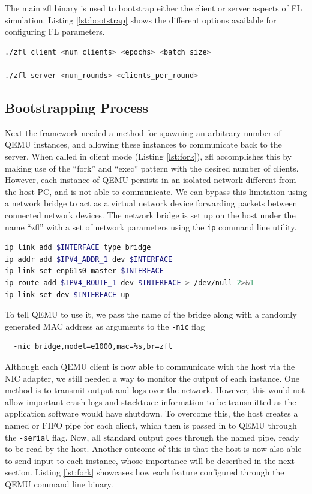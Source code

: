 \documentclass[12pt]{article}
\begin{document}
The main zfl binary is used to bootstrap either the client or server aspects of FL simulation.
Listing \ref{lst:bootstrap} shows the different options available for configuring FL parameters.
\begin{lstlisting}[language=bash,caption={The main zfl binary},label={lst:bootstrap}]
./zfl client <num_clients> <epochs> <batch_size>

./zfl server <num_rounds> <clients_per_round>
\end{lstlisting}

\subsection{Bootstrapping Process}
Next the framework needed a method for spawning an arbitrary number of QEMU instances, and allowing
these instances to communicate back to the server. When called in client mode (Listing
\ref{lst:fork}), zfl accomplishes this
by making use of the ``fork'' and ``exec'' pattern with the desired number of clients. \\

However, each instance of QEMU persists in an isolated network different from the host PC,
and is not able to communicate. We can bypass this limitation using a network bridge to act as a
virtual network device forwarding packets between connected network devices.
The network bridge is set up on the host under the name ``zfl'' with a set of network parameters using
the \verb|ip| command line utility.
\begin{lstlisting}[language=bash,caption=Network bridge setup]
ip link add $INTERFACE type bridge
ip addr add $IPV4_ADDR_1 dev $INTERFACE
ip link set enp61s0 master $INTERFACE
ip route add $IPV4_ROUTE_1 dev $INTERFACE > /dev/null 2>&1
ip link set dev $INTERFACE up
\end{lstlisting}
To tell QEMU to use it, we pass the name of the bridge along
with a randomly generated MAC address as arguments to the \verb|-nic| flag
\begin{verbatim}
  -nic bridge,model=e1000,mac=%s,br=zfl
\end{verbatim}

Although each QEMU client is now able to communicate with the host via the NIC adapter, we still
needed a way to monitor the output of each instance. One method is to transmit
output and logs over the network. However, this would not allow important crash logs and stacktrace
information to be transmitted as the application software would have shutdown. To overcome this, the host
creates a named or FIFO pipe for each client, which then is passed in to
QEMU through the \verb|-serial| flag. Now, all standard output goes through the named pipe, ready to be read
by the host. Another outcome of this is that the host is now also able to send input to each
instance, whose importance will be described in the next section. Listing \ref{lst:fork} showcases
how each feature configured through the QEMU command line binary.
\end{document}
